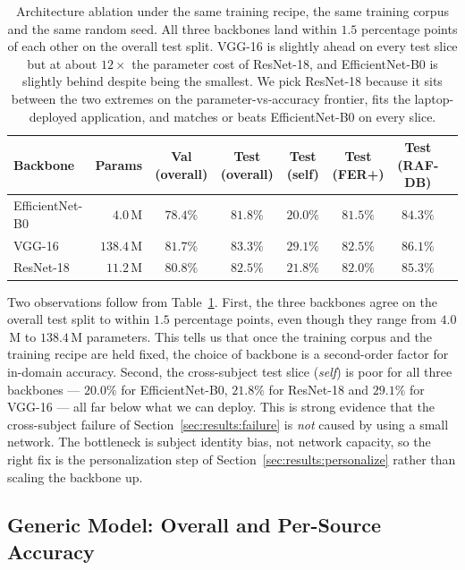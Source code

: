 \documentclass[12pt,a4paper]{article}
\begin{document}
\begin{table}[H]
  \centering
  \footnotesize
  \begin{tabular}{lrcccccc}
    \toprule
    Backbone   & Params         & Val (overall) & Test (overall) & Test (self) & Test (FER+) & Test (RAF-DB) \\
    \midrule
    EfficientNet-B0 & $4.0$\,M & $78.4\%$ & $81.8\%$ & $20.0\%$ & $81.5\%$ & $84.3\%$ \\
    VGG-16     & $138.4$\,M         & $81.7\%$ & $83.3\%$ & $29.1\%$ & $82.5\%$ & $86.1\%$ \\
    ResNet-18  & $\mathbf{11.2}$\,M & $80.8\%$ & $82.5\%$ & $21.8\%$ & $82.0\%$ & $85.3\%$ \\
    \bottomrule
  \end{tabular}
  \caption{Architecture ablation under the same training
  recipe, the same training corpus and the same random seed.
  All three backbones land within $1.5$ percentage points of
  each other on the overall test split. VGG-16 is slightly
  ahead on every test slice but at about $12\times$ the
  parameter cost of ResNet-18, and EfficientNet-B0 is slightly
  behind despite being the smallest. We pick ResNet-18 because
  it sits between the two extremes on the parameter-vs-accuracy
  frontier, fits the laptop-deployed application, and matches
  or beats EfficientNet-B0 on every slice.}
  \label{tab:archabl}
\end{table}

Two observations follow from Table~\ref{tab:archabl}. First,
the three backbones agree on the overall test split to within
$1.5$ percentage points, even though they range from $4.0$\,M
to $138.4$\,M parameters. This tells us that once the training
corpus and the training recipe are held fixed, the choice of
backbone is a second-order factor for in-domain accuracy.
Second, the cross-subject test slice (\emph{self}) is poor for
all three backbones --- $20.0\%$ for EfficientNet-B0, $21.8\%$
for ResNet-18 and $29.1\%$ for VGG-16 --- all far below what
we can deploy. This is strong evidence that the cross-subject
failure of Section~\ref{sec:results:failure} is \emph{not}
caused by using a small network. The bottleneck is subject
identity bias, not network capacity, so the right fix is the
personalization step of
Section~\ref{sec:results:personalize} rather than scaling the
backbone up.

\subsection{Generic Model: Overall and Per-Source Accuracy}
\label{sec:results:overall}
\end{document}
